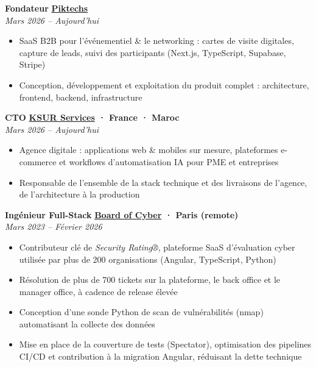 \documentclass[a4paper,11pt]{article}
\newcommand{\expdivider}{\vspace{0.01cm}\noindent{\color{light!60!gray}\rule{\linewidth}{0.4pt}}\vspace{0.01cm}}
\begin{document}
\expdivider

\noindent\textbf{Fondateur} \hfill \textbf{\href{https://piktechs.com}{Piktechs}} \\
\textit{Mars 2026 – Aujourd'hui}
\begin{itemize}[nosep]
    \item SaaS B2B pour l'événementiel \& le networking : cartes de visite digitales, capture de leads, suivi des participants (Next.js, TypeScript, Supabase, Stripe)
    \item Conception, développement et exploitation du produit complet : architecture, frontend, backend, infrastructure
\end{itemize}

\expdivider

\noindent\textbf{CTO} \hfill \textbf{\href{https://www.agence-ksur.com}{KSUR Services} · France · Maroc} \\
\textit{Mars 2026 – Aujourd'hui}
\begin{itemize}[nosep]
    \item Agence digitale : applications web \& mobiles sur mesure, plateformes e-commerce et workflows d'automatisation IA pour PME et entreprises
    \item Responsable de l'ensemble de la stack technique et des livraisons de l'agence, de l'architecture à la production
\end{itemize}

\expdivider

\noindent\textbf{Ingénieur Full-Stack} \hfill \textbf{\href{https://www.boardofcyber.io}{Board of Cyber} · Paris (remote)} \\
\textit{Mars 2023 – Février 2026}
\begin{itemize}[nosep]
    \item Contributeur clé de \textit{Security Rating®}, plateforme SaaS d'évaluation cyber utilisée par plus de 200 organisations (Angular, TypeScript, Python)
    \item Résolution de plus de 700 tickets sur la plateforme, le back office et le manager office, à cadence de release élevée
    \item Conception d'une sonde Python de scan de vulnérabilités (nmap) automatisant la collecte des données
    \item Mise en place de la couverture de tests (Spectator), optimisation des pipelines CI/CD et contribution à la migration Angular, réduisant la dette technique
\end{itemize}
\end{document}
